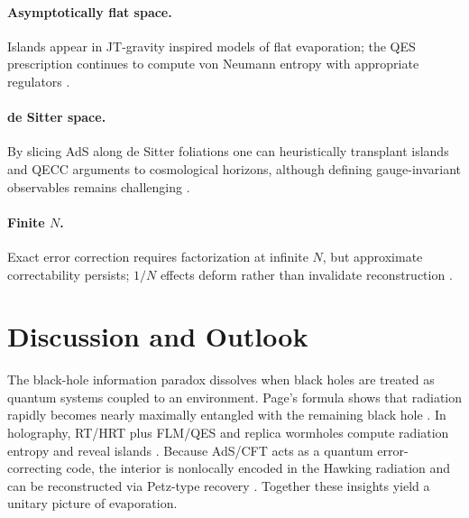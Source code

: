 \documentclass[12pt, numbers, sort&compress]{article}
\begin{document}
\paragraph{Asymptotically flat space.}
Islands appear in JT-gravity inspired models of flat evaporation; the QES prescription continues to compute von Neumann entropy with appropriate regulators \cite{Gautason:2023flatIslands}.

\paragraph{de Sitter space.}
By slicing AdS along de Sitter foliations one can heuristically transplant islands and QECC arguments to cosmological horizons, although defining gauge-invariant observables remains challenging \cite{Akers:2023dSislands}.

\paragraph{Finite $N$.}
Exact error correction requires factorization at infinite $N$, but approximate correctability persists; $1/N$ effects deform rather than invalidate reconstruction \cite{Hayden:2024approximate}.

\section{Discussion and Outlook}
The black-hole information paradox dissolves when black holes are treated as quantum systems coupled to an environment. Page’s formula shows that radiation rapidly becomes nearly maximally entangled with the remaining black hole \cite{Page:1993prl}. In holography, RT/HRT plus FLM/QES and replica wormholes compute radiation entropy and reveal islands \cite{Ryu:2006prl,Faulkner:2013FLM,EngelhardtWall:2015QES,SciPost:2020islands,Penington:2023replica}. Because AdS/CFT acts as a quantum error-correcting code, the interior is nonlocally encoded in the Hawking radiation and can be reconstructed via Petz-type recovery \cite{ADH:2015,JLMS:2016,Penington:2019petz}. Together these insights yield a unitary picture of evaporation.
\end{document}
